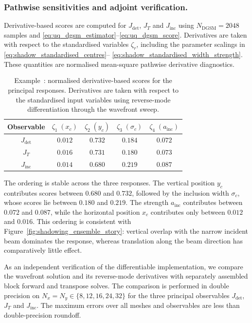\documentclass[final]{amsart}
\newcounter{numexample}
\newcommand{\CurrentExample}{Example~\thenumexample}
\begin{document}
\subsubsection{Pathwise sensitivities and adjoint verification.}

Derivative-based scores \cite{SobolKucherenko2009DGSM,Cacuci2003} are
computed for $J_{\mathrm{det}}$, $J_T$ and $J_{\mathrm{inc}}$ using
$N_{\mathrm{DGSM}}=2048$ samples and
\eqref{eq:uq_dgsm_estimator}--\eqref{eq:uq_dgsm_score}.  Derivatives
are taken with respect to the standardised variables $\zeta_r$,
including the parameter scalings in
\eqref{eq:shadow_standardised_centres}--%
\eqref{eq:shadow_standardised_width_strength}. These quantities are
normalised mean-square pathwise derivative diagnostics.

\begin{table}[h!]
\centering
\scriptsize
\setlength{\tabcolsep}{7pt}
\begin{tabular}{ccccc}
\hline
Observable
& $\zeta_1\;(x_c)$
& $\zeta_2\;(y_c)$
& $\zeta_3\;(\sigma_c)$
& $\zeta_4\;(a_{\mathrm{inc}})$
\\
\hline
$J_{\mathrm{det}}$ & $0.012$ & $0.732$ & $0.184$ & $0.072$ \\
$J_T$              & $0.016$ & $0.731$ & $0.180$ & $0.073$ \\
$J_{\mathrm{inc}}$ & $0.014$ & $0.680$ & $0.219$ & $0.087$ \\
\hline
\end{tabular}
\caption{\CurrentExample: normalised derivative-based scores for the
principal responses. Derivatives are taken with respect to the
standardised input variables using reverse-mode differentiation
through the wavefront sweep.}
\label{tab:shadowing_dgsm}
\end{table}

The ordering is stable across the three responses. The vertical
position $y_c$ contributes scores between $0.680$ and $0.732$,
followed by the inclusion width $\sigma_c$, whose scores lie between
$0.180$ and $0.219$. The strength $a_{\mathrm{inc}}$ contributes between
$0.072$ and $0.087$, while the horizontal position $x_c$ contributes
only between $0.012$ and $0.016$. This ordering is consistent with
Figure~\ref{fig:shadowing_ensemble_story}: vertical overlap with the
narrow incident beam dominates the response, whereas translation
along the beam direction has comparatively little effect.

As an independent verification of the differentiable implementation,
we compare the wavefront solution and its reverse-mode derivatives
with separately assembled block forward and transpose solves.  The
comparison is performed in double precision on
$N_x=N_y\in\{8,12,16,24,32\}$ for the three principal observables
$J_{\mathrm{det}}$, $J_T$ and $J_{\mathrm{inc}}$. The maximum errors
over all meshes and observables are less than double-precision
roundoff.
\end{document}
